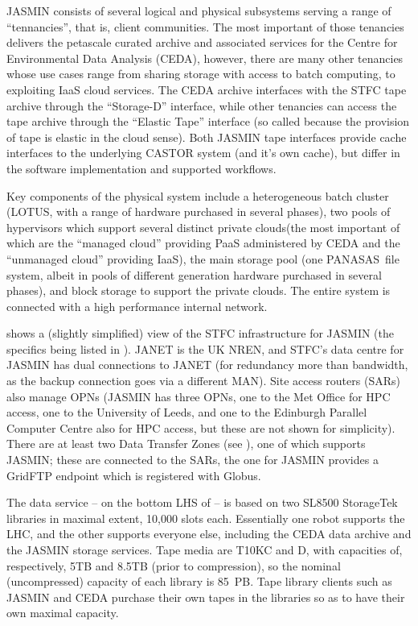 JASMIN  consists of several logical and physical subsystems serving a range of ``tennancies'', that is, client communities. The most important of those tenancies delivers the petascale curated archive and associated services for the Centre for Environmental Data Analysis (CEDA), however, there are many other tenancies whose use cases range from sharing storage with access to batch computing, to exploiting IaaS cloud services.  The CEDA archive interfaces with the STFC tape archive through the ``Storage-D'' interface, while other tenancies can access the tape archive through the ``Elastic Tape'' interface (so called because the provision of tape is elastic in the cloud sense). Both JASMIN tape interfaces provide cache interfaces to the underlying CASTOR system (and it's own cache), but differ in the software implementation and supported workflows.

Key components of the physical system include a heterogeneous batch cluster (LOTUS, with a range of hardware purchased in several phases), two pools of hypervisors which support several distinct private clouds(the most important of which are the ``managed cloud'' providing PaaS administered by CEDA and the ``unmanaged cloud'' providing IaaS), the main storage pool (one PANASAS\texttrademark\ file system, albeit in pools of different generation hardware purchased in several phases), and block storage to support the private clouds. The entire system is connected with a high performance internal network.

 shows a (slightly simplified) view of the STFC infrastructure for JASMIN (the specifics being
listed in ).  JANET is the UK NREN, and STFC's data centre for JASMIN has dual connections to
JANET (for redundancy more than bandwidth, as the backup connection goes via a different MAN).  Site access routers
(SARs) also manage OPNs (JASMIN has three OPNs, one to the Met Office for HPC access, one to the University of Leeds, and one to the Edinburgh Parallel Computer Centre also for HPC access, but these are not shown for simplicity).  There are at least two Data Transfer Zones (see
), one of which supports JASMIN; these are connected to the SARs, the one for JASMIN provides a GridFTP endpoint which is registered with Globus.

The data service -- on the bottom LHS of  -- is based on two SL8500 StorageTek libraries in maximal
extent, 10,000 slots each.  Essentially one robot supports the LHC, and the other supports everyone else, including the
CEDA data archive and the JASMIN storage services.  Tape media are T10KC and D, with capacities of, respectively, 5TB
and 8.5TB (prior to compression), so the nominal (uncompressed) capacity of each library is 85~PB. Tape library clients such as JASMIN and CEDA purchase their own tapes in the libraries so as to have their own maximal capacity.
